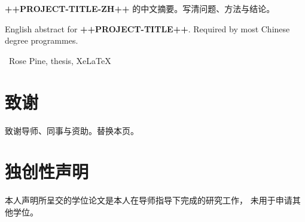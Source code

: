 \begin{thesisabstract}[摘要]
\textbf{++PROJECT-TITLE-ZH++} 的中文摘要。写清问题、方法与结论。
\end{thesisabstract}

\begin{thesisabstract}[Abstract]
English abstract for \textbf{++PROJECT-TITLE++}.
Required by most Chinese degree programmes.
\end{thesisabstract}
\renewcommand{\thesiskeywords}[1]{%
  \par\vspace{0.55em}
  \ \textcolor{rptext}{#1}\par
}
\thesiskeywords{Rose Pine, thesis, XeLaTeX}

\chapter*{致谢}

致谢导师、同事与资助。替换本页。

\chapter*{独创性声明}

本人声明所呈交的学位论文是本人在导师指导下完成的研究工作，
未用于申请其他学位。
